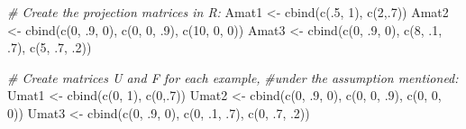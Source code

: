 \documentclass[
]{book}
\newenvironment{Shaded}{\begin{snugshade}}{\end{snugshade}}
\newcommand{\CommentTok}[1]{\textcolor[rgb]{0.56,0.35,0.01}{\textit{#1}}}
\newcommand{\DecValTok}[1]{\textcolor[rgb]{0.00,0.00,0.81}{#1}}
\newcommand{\FunctionTok}[1]{\textcolor[rgb]{0.00,0.00,0.00}{#1}}
\newcommand{\NormalTok}[1]{#1}
\newcommand{\OtherTok}[1]{\textcolor[rgb]{0.56,0.35,0.01}{#1}}
\begin{document}
\begin{Shaded}
\begin{Highlighting}[]
\CommentTok{\# Create the projection matrices in R:}
\NormalTok{Amat1 }\OtherTok{\textless{}{-}} \FunctionTok{cbind}\NormalTok{(}\FunctionTok{c}\NormalTok{(.}\DecValTok{5}\NormalTok{, }\DecValTok{1}\NormalTok{), }
               \FunctionTok{c}\NormalTok{(}\DecValTok{2}\NormalTok{,.}\DecValTok{7}\NormalTok{))}
\NormalTok{Amat2 }\OtherTok{\textless{}{-}} \FunctionTok{cbind}\NormalTok{(}\FunctionTok{c}\NormalTok{(}\DecValTok{0}\NormalTok{, .}\DecValTok{9}\NormalTok{, }\DecValTok{0}\NormalTok{),}
               \FunctionTok{c}\NormalTok{(}\DecValTok{0}\NormalTok{, }\DecValTok{0}\NormalTok{, .}\DecValTok{9}\NormalTok{), }
               \FunctionTok{c}\NormalTok{(}\DecValTok{10}\NormalTok{, }\DecValTok{0}\NormalTok{, }\DecValTok{0}\NormalTok{))}
\NormalTok{Amat3 }\OtherTok{\textless{}{-}} \FunctionTok{cbind}\NormalTok{(}\FunctionTok{c}\NormalTok{(}\DecValTok{0}\NormalTok{, .}\DecValTok{9}\NormalTok{, }\DecValTok{0}\NormalTok{), }
               \FunctionTok{c}\NormalTok{(}\DecValTok{8}\NormalTok{, .}\DecValTok{1}\NormalTok{, .}\DecValTok{7}\NormalTok{), }
               \FunctionTok{c}\NormalTok{(}\DecValTok{5}\NormalTok{, .}\DecValTok{7}\NormalTok{, .}\DecValTok{2}\NormalTok{))}

\CommentTok{\# Create matrices U and F for each example, }
\CommentTok{\#under the assumption mentioned:}
\NormalTok{Umat1 }\OtherTok{\textless{}{-}} \FunctionTok{cbind}\NormalTok{(}\FunctionTok{c}\NormalTok{(}\DecValTok{0}\NormalTok{, }\DecValTok{1}\NormalTok{), }
               \FunctionTok{c}\NormalTok{(}\DecValTok{0}\NormalTok{,.}\DecValTok{7}\NormalTok{))}
\NormalTok{Umat2 }\OtherTok{\textless{}{-}} \FunctionTok{cbind}\NormalTok{(}\FunctionTok{c}\NormalTok{(}\DecValTok{0}\NormalTok{, .}\DecValTok{9}\NormalTok{, }\DecValTok{0}\NormalTok{), }
               \FunctionTok{c}\NormalTok{(}\DecValTok{0}\NormalTok{, }\DecValTok{0}\NormalTok{, .}\DecValTok{9}\NormalTok{), }
               \FunctionTok{c}\NormalTok{(}\DecValTok{0}\NormalTok{, }\DecValTok{0}\NormalTok{, }\DecValTok{0}\NormalTok{))}
\NormalTok{Umat3 }\OtherTok{\textless{}{-}} \FunctionTok{cbind}\NormalTok{(}\FunctionTok{c}\NormalTok{(}\DecValTok{0}\NormalTok{, .}\DecValTok{9}\NormalTok{, }\DecValTok{0}\NormalTok{), }
               \FunctionTok{c}\NormalTok{(}\DecValTok{0}\NormalTok{, .}\DecValTok{1}\NormalTok{, .}\DecValTok{7}\NormalTok{), }
               \FunctionTok{c}\NormalTok{(}\DecValTok{0}\NormalTok{, .}\DecValTok{7}\NormalTok{, .}\DecValTok{2}\NormalTok{))}


\end{Highlighting}
\end{Shaded}
\end{document}
